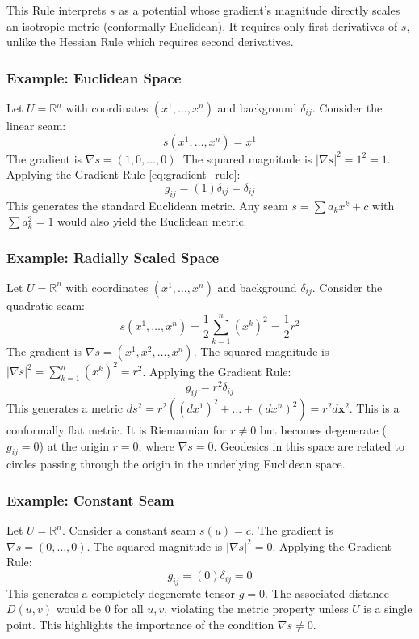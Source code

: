 \documentclass[twoside,twocolumn]{article}
\begin{document}
This Rule interprets \( s \) as a potential whose gradient’s magnitude directly scales an isotropic metric (conformally Euclidean). It requires only first derivatives of \( s \), unlike the Hessian Rule which requires second derivatives.

\subsubsection{Example: Euclidean Space}
Let $U = \mathbb{R}^n$ with coordinates $(x^1, \dots, x^n)$ and background $\delta_{ij}$. Consider the linear seam:
$$ s(x^1, \dots, x^n) = x^1 $$
The gradient is $\nabla s = (1, 0, \dots, 0)$. The squared magnitude is $|\nabla s|^2 = 1^2 = 1$. Applying the Gradient Rule \eqref{eq:gradient_rule}:
$$ g_{ij} = (1) \delta_{ij} = \delta_{ij} $$
This generates the standard Euclidean metric. Any seam $s = \sum a_k x^k + c$ with $\sum a_k^2 = 1$ would also yield the Euclidean metric.

\subsubsection{Example: Radially Scaled Space}
Let $U = \mathbb{R}^n$ with coordinates $(x^1, \dots, x^n)$ and background $\delta_{ij}$. Consider the quadratic seam:
$$ s(x^1, \dots, x^n) = \frac{1}{2} \sum_{k=1}^n (x^k)^2 = \frac{1}{2} r^2 $$
The gradient is $\nabla s = (x^1, x^2, \dots, x^n)$. The squared magnitude is $|\nabla s|^2 = \sum_{k=1}^n (x^k)^2 = r^2$. Applying the Gradient Rule:
$$ g_{ij} = r^2 \delta_{ij} $$
This generates a metric $ds^2 = r^2 ( (dx^1)^2 + \dots + (dx^n)^2 ) = r^2 d\mathbf{x}^2$. This is a conformally flat metric. It is Riemannian for $r \neq 0$ but becomes degenerate ($g_{ij}=0$) at the origin $r=0$, where $\nabla s = 0$. Geodesics in this space are related to circles passing through the origin in the underlying Euclidean space.

\subsubsection{Example: Constant Seam}
Let $U = \mathbb{R}^n$. Consider a constant seam $s(u) = c$.
The gradient is $\nabla s = (0, \dots, 0)$. The squared magnitude is $|\nabla s|^2 = 0$. Applying the Gradient Rule:
$$ g_{ij} = (0) \delta_{ij} = 0 $$
This generates a completely degenerate tensor $g=0$. The associated distance $D(u, v)$ would be 0 for all $u, v$, violating the metric property unless $U$ is a single point. This highlights the importance of the condition $\nabla s \neq 0$.
\end{document}
